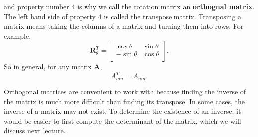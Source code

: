 \documentclass{article}
\begin{document}
and property number 4 is why we call the rotation matrix an \textbf{orthognal matrix}.
The left hand side of property 4 is called the transpose matrix.
Transposing a matrix means taking the columns of a matrix and turning them into rows.
For example,
\begin{equation}
  \textbf{R}_{\theta}^{T} =
  \begin{bmatrix}
    \cos{\theta} & \sin{\theta}\\
    -\sin{\theta} & \cos{\theta}\\
  \end{bmatrix}.
\end{equation}
So in general, for any matrix \textbf{A},
\begin{equation}
  A_{mn}^T = A_{nm} .
\end{equation}

Orthogonal matrices are convenient to work with because finding the inverse of the matrix is much more difficult than finding its transpose.
In some cases, the inverse of a matrix may not exist.
To determine the existence of an inverse, it would be easier to first compute the determinant of the matrix, which we will discuss next lecture.
\end{document}
